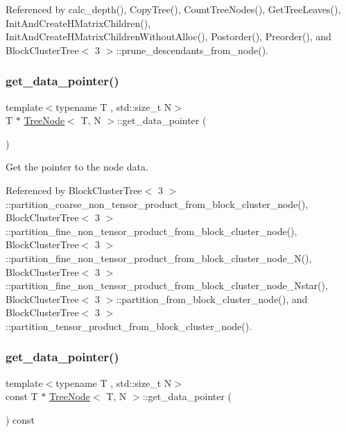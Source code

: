 Referenced by calc\+\_\+depth(), Copy\+Tree(), Count\+Tree\+Nodes(), Get\+Tree\+Leaves(), Init\+And\+Create\+H\+Matrix\+Children(), Init\+And\+Create\+H\+Matrix\+Children\+Without\+Alloc(), Postorder(), Preorder(), and Block\+Cluster\+Tree$<$ 3 $>$\+::prune\+\_\+descendants\+\_\+from\+\_\+node().

\mbox{\label{classTreeNode_aaa2ba047902c4e2fccffe3424a0c665b}} 
\subsubsection{\texorpdfstring{get\+\_\+data\+\_\+pointer()}{get\_data\_pointer()}\hspace{0.1cm}{\footnotesize\ttfamily [1/2]}}
{\footnotesize\ttfamily template$<$typename T , std\+::size\+\_\+t N$>$ \\
T $\ast$ \hyperlink{classTreeNode}{Tree\+Node}$<$ T, N $>$\+::get\+\_\+data\+\_\+pointer (\begin{DoxyParamCaption}{ }\end{DoxyParamCaption})}

Get the pointer to the node data. 

Referenced by Block\+Cluster\+Tree$<$ 3 $>$\+::partition\+\_\+coarse\+\_\+non\+\_\+tensor\+\_\+product\+\_\+from\+\_\+block\+\_\+cluster\+\_\+node(), Block\+Cluster\+Tree$<$ 3 $>$\+::partition\+\_\+fine\+\_\+non\+\_\+tensor\+\_\+product\+\_\+from\+\_\+block\+\_\+cluster\+\_\+node(), Block\+Cluster\+Tree$<$ 3 $>$\+::partition\+\_\+fine\+\_\+non\+\_\+tensor\+\_\+product\+\_\+from\+\_\+block\+\_\+cluster\+\_\+node\+\_\+\+N(), Block\+Cluster\+Tree$<$ 3 $>$\+::partition\+\_\+fine\+\_\+non\+\_\+tensor\+\_\+product\+\_\+from\+\_\+block\+\_\+cluster\+\_\+node\+\_\+\+Nstar(), Block\+Cluster\+Tree$<$ 3 $>$\+::partition\+\_\+from\+\_\+block\+\_\+cluster\+\_\+node(), and Block\+Cluster\+Tree$<$ 3 $>$\+::partition\+\_\+tensor\+\_\+product\+\_\+from\+\_\+block\+\_\+cluster\+\_\+node().

\mbox{\label{classTreeNode_ac6894ba6488ee38978ef2476366f6318}} 
\subsubsection{\texorpdfstring{get\+\_\+data\+\_\+pointer()}{get\_data\_pointer()}\hspace{0.1cm}{\footnotesize\ttfamily [2/2]}}
{\footnotesize\ttfamily template$<$typename T , std\+::size\+\_\+t N$>$ \\
const T $\ast$ \hyperlink{classTreeNode}{Tree\+Node}$<$ T, N $>$\+::get\+\_\+data\+\_\+pointer (\begin{DoxyParamCaption}{ }\end{DoxyParamCaption}) const}

